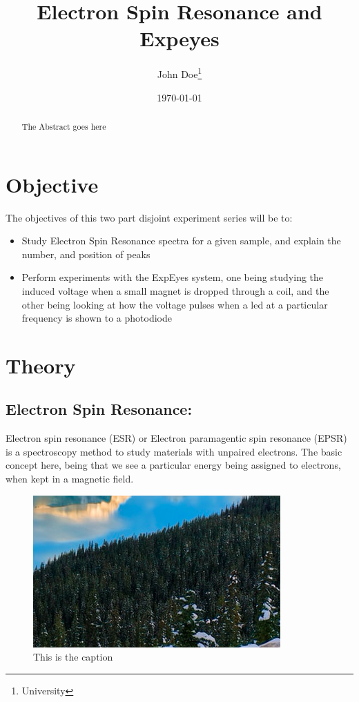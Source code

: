 \documentclass{double}
\begin{document}
\title{Electron Spin Resonance and Expeyes}
\author{John Doe\thanks{University}}
\date{\today}
\maketitle
    \begin{abstract}

The Abstract goes here


\end{abstract}

\section{Objective}

The objectives of this two part disjoint experiment series will be to:  

\begin{itemize}
	\item Study Electron Spin Resonance spectra for a given sample, and explain the number, and position of peaks
	\item Perform experiments with the ExpEyes system, one being studying the induced voltage when a small magnet is dropped through a coil, and the other being looking at how the voltage pulses when a led at a particular frequency is shown to a photodiode
\end{itemize}

\section{Theory}
\subsection{Electron Spin Resonance:}
Electron spin resonance (ESR) or Electron paramagentic spin resonance (EPSR) is a spectroscopy method to study materials with unpaired electrons. The basic concept here, being that we see a particular energy being assigned to electrons, when kept in a magnetic field.

\begin{figure}[H]
    \includegraphics[width = \columnwidth]{image.png}
    \centering
    \caption{This is the caption}
    \label{f:image}
\end{figure}
            
\end{document}
